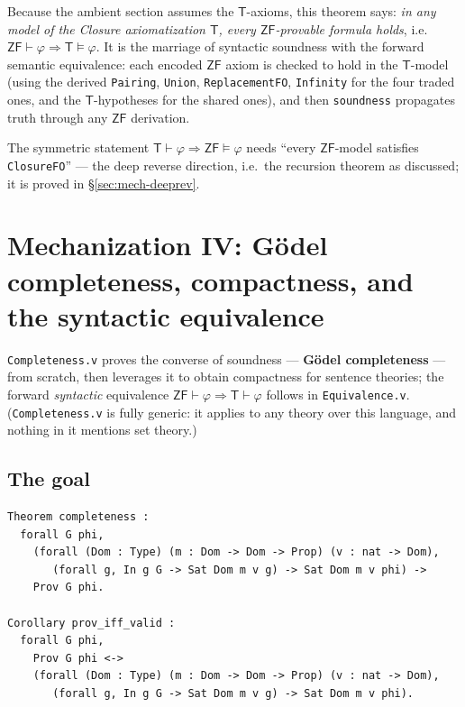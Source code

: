 \documentclass[11pt]{article}
\theoremstyle{plain}
\theoremstyle{definition}
\newcommand{\ZF}{\mathsf{ZF}}
\renewcommand{\ZF}{\textsf{ZF}}
\newcommand{\T}{\textsf{T}}
\newcommand{\proves}{\vdash}
\newcommand{\cq}[1]{\lstinline[basicstyle=\ttfamily]|#1|}
\begin{document}
Because the ambient section assumes the $\T$-axioms, this theorem says: \emph{in
any model of the Closure axiomatization $\T$, every $\ZF$-provable formula holds},
i.e.\ $\ZF \proves \varphi \Rightarrow \T \models \varphi$. It is the marriage of
syntactic soundness with the forward semantic equivalence: each encoded $\ZF$ axiom
is checked to hold in the $\T$-model (using the derived \cq{Pairing}, \cq{Union},
\cq{ReplacementFO}, \cq{Infinity} for the four traded ones, and the $\T$-hypotheses
for the shared ones), and then \cq{soundness} propagates truth through any $\ZF$
derivation.

The symmetric statement $\T \proves \varphi \Rightarrow \ZF \models \varphi$ needs
``every $\ZF$-model satisfies \cq{ClosureFO}'' --- the deep reverse direction,
i.e.\ the recursion theorem as discussed; it is proved in
\S\ref{sec:mech-deeprev}.

\section{Mechanization IV: G\"odel completeness, compactness, and the syntactic equivalence}\label{sec:mech-compl}

\texttt{Completeness.v} proves the converse of soundness ---
\textbf{G\"odel completeness} --- from scratch, then leverages it to obtain
compactness for sentence theories; the forward \emph{syntactic} equivalence
$\ZF \proves \varphi \Rightarrow \T \proves \varphi$ follows in
\texttt{Equivalence.v}. (\texttt{Completeness.v} is fully generic: it applies to
any theory over this language, and nothing in it mentions set theory.)

\subsection{The goal}

\begin{lstlisting}
Theorem completeness :
  forall G phi,
    (forall (Dom : Type) (m : Dom -> Dom -> Prop) (v : nat -> Dom),
       (forall g, In g G -> Sat Dom m v g) -> Sat Dom m v phi) ->
    Prov G phi.

Corollary prov_iff_valid :
  forall G phi,
    Prov G phi <->
    (forall (Dom : Type) (m : Dom -> Dom -> Prop) (v : nat -> Dom),
       (forall g, In g G -> Sat Dom m v g) -> Sat Dom m v phi).
\end{lstlisting}
\end{document}
